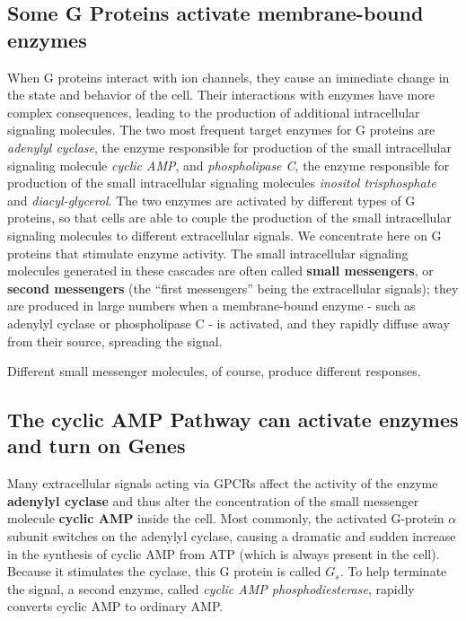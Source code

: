 \subsection{Some G Proteins activate membrane-bound enzymes}

When G proteins interact with ion channels, they cause an immediate 
change in the state and behavior of the cell. Their interactions with
enzymes have more complex consequences, leading to the production
of additional intracellular signaling molecules. The two most frequent
target enzymes for G proteins are \textit{adenylyl cyclase}, the enzyme responsible 
for production of the small intracellular signaling molecule \textit{cyclic
AMP}, and \textit{phospholipase C}, the enzyme responsible for production of the
small intracellular signaling molecules \textit{inositol trisphosphate} and \textit{diacyl-glycerol}. 
The two enzymes are activated by different types of G proteins,
so that cells are able to couple the production of the small intracellular
signaling molecules to different extracellular signals. We concentrate
here on G proteins that stimulate enzyme activity. The small intracellular
signaling molecules generated in these cascades are often called \textbf{small
messengers}, or \textbf{second messengers} (the “first messengers” being the
extracellular signals); they are produced in large numbers when a membrane-bound 
enzyme - such as adenylyl cyclase or phospholipase C - is
activated, and they rapidly diffuse away from their source, spreading the
signal.

Different small messenger molecules, of course, produce different
responses.

\subsection{The cyclic AMP Pathway can activate enzymes and turn on Genes}

Many extracellular signals acting via GPCRs affect the activity of the
enzyme \textbf{adenylyl cyclase} and thus alter the concentration of the small
messenger molecule \textbf{cyclic AMP} inside the cell. Most commonly, the
activated G-protein $\alpha$ subunit switches on the adenylyl cyclase, causing
a dramatic and sudden increase in the synthesis of cyclic AMP from ATP
(which is always present in the cell). Because it stimulates the cyclase,
this G protein is called $G_s$. To help terminate the signal, a second enzyme,
called \textit{cyclic AMP phosphodiesterase}, rapidly converts cyclic AMP to ordinary AMP.

